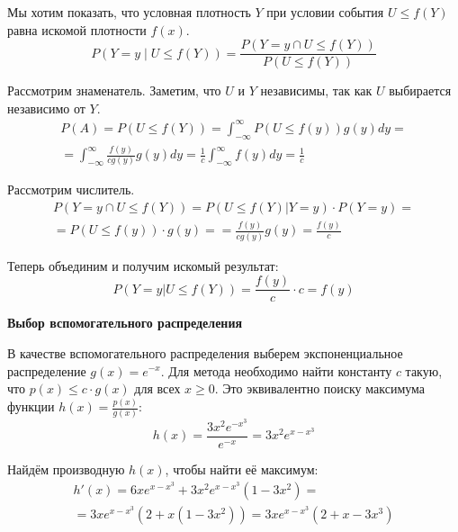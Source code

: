 \documentclass[a4paper,14pt]{extarticle}
\begin{document}
                    Мы хотим показать, что условная плотность $Y$ при условии события $U \leq f(Y)$ равна искомой плотности $f(x)$.
                    \[
                    P(Y = y \mid U \leq f(Y)) =
                    \frac{P(Y = y \cap U \leq f(Y))}{P(U \leq f(Y))}
                    \]
                    
                    Рассмотрим знаменатель. Заметим, что $U$ и $Y$ независимы, так как $U$ выбирается независимо от $Y$.
                    \begin{gather*}
                            P(A) =
                            P(U \leq f(Y)) =
                            \int_{-\infty}^{\infty} P(U \leq f(y)) g(y) dy =\\
                            = \int_{-\infty}^{\infty} \frac{f(y)}{cg(y)} g(y) dy =
                            \frac{1}{c} \int_{-\infty}^{\infty} f(y) dy =
                            \frac{1}{c}
                    \end{gather*}
                    
                    Рассмотрим числитель.
                    \begin{gather*}
                            P(Y = y \cap U\le f(Y)) = P(U\le f(Y) | Y = y) \cdot P (Y = y) =\\
                            = P(U\le f(y)) \cdot g(y) =
                            = \frac{f(y)}{cg(y)}g(y) = \frac{f(y)}{c}
                    \end{gather*}
                    
                    Теперь объединим и получим искомый результат:
                    \[
                    P(Y=y|U\le f(Y)) =
                    \frac{f(y)}{c}\cdot c = f(y)
                    \]
                
                \textbf{Выбор вспомогательного распределения} 
                    
                    В качестве вспомогательного распределения выберем экспоненциальное распределение $g(x) = e^{-x}$.
                    Для метода необходимо найти константу $c$ такую, что $p(x) \leq c \cdot g(x)$ для всех $x \geq 0$.
                    Это эквивалентно поиску максимума функции $h(x) = \frac{p(x)}{g(x)}$:
                    \[
                    h(x) = \frac{3x^2 e^{-x^3}}{e^{-x}} = 3x^2 e^{x - x^3}
                    \]
                    
                    Найдём производную $h(x)$, чтобы найти её максимум:
                    \begin{gather*}
                            h'(x) = 6x e^{x - x^3} + 3x^2 e^{x - x^3} (1 - 3x^2) = \\
                            = 3x e^{x - x^3} (2 + x(1 - 3x^2)) = 3x e^{x - x^3} (2 + x - 3x^3)
                    \end{gather*}
                    
\end{document}
